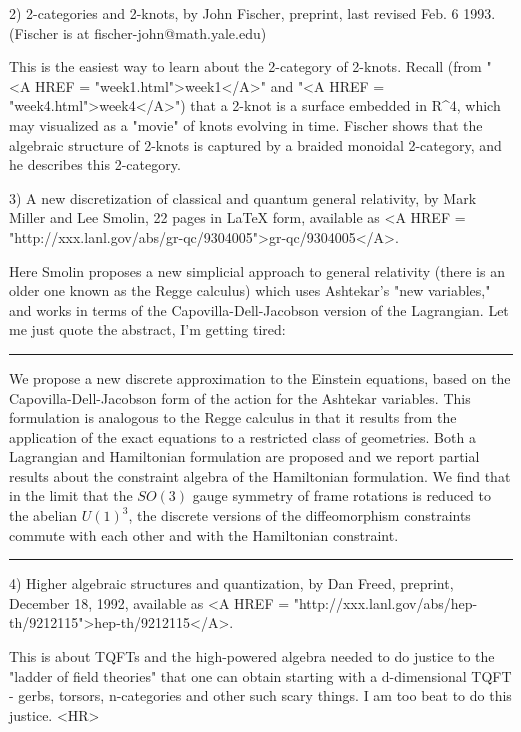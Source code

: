 2) 2-categories and 2-knots, by John Fischer, preprint, last revised Feb.
6 1993.  (Fischer is at fischer-john@math.yale.edu)

This is the easiest way to learn about the 2-category of 2-knots.  
Recall (from "<A HREF = "week1.html">week1</A>" and "<A HREF = "week4.html">week4</A>") that a 2-knot is a surface embedded in
R^4, which may visualized as a "movie" of knots evolving in time.  
Fischer shows that the algebraic structure of 2-knots is captured by
a braided monoidal 2-category, and he describes this 2-category.

3) A new discretization of classical and quantum general relativity, by
Mark Miller and Lee Smolin, 22 pages in LaTeX form, available as 
<A HREF = "http://xxx.lanl.gov/abs/gr-qc/9304005">gr-qc/9304005</A>.

Here Smolin proposes a new simplicial approach to general relativity
(there is an older one known as the Regge calculus) which uses
Ashtekar's "new variables," and works in terms of the
Capovilla-Dell-Jacobson version of the Lagrangian.
Let me just quote the abstract, I'm getting tired:

\par\noindent\rule{\textwidth}{0.4pt}
We propose a new discrete approximation to the Einstein equations,
based on the Capovilla-Dell-Jacobson form of the action for the
Ashtekar variables.  This formulation is analogous to the Regge
calculus in that it results from the application of the exact
equations to a restricted class of geometries.  Both a Lagrangian
and Hamiltonian formulation are proposed and we report partial
results about the constraint algebra of the Hamiltonian formulation.
We find that in the limit that the $SO(3)$ gauge symmetry of frame
rotations is reduced to the abelian $U(1)^3$, the discrete versions
of the  diffeomorphism constraints commute with each other and with
the Hamiltonian constraint.
\par\noindent\rule{\textwidth}{0.4pt}

4)  Higher algebraic structures and quantization, by Dan Freed,
preprint, December 18, 1992, available as <A HREF = "http://xxx.lanl.gov/abs/hep-th/9212115">hep-th/9212115</A>.  

This is about TQFTs and the high-powered algebra needed to do justice to
the "ladder of field theories" that one can obtain starting with a
d-dimensional TQFT - gerbs, torsors, n-categories and other such scary
things.  I am too beat to do this justice.  
<HR>



